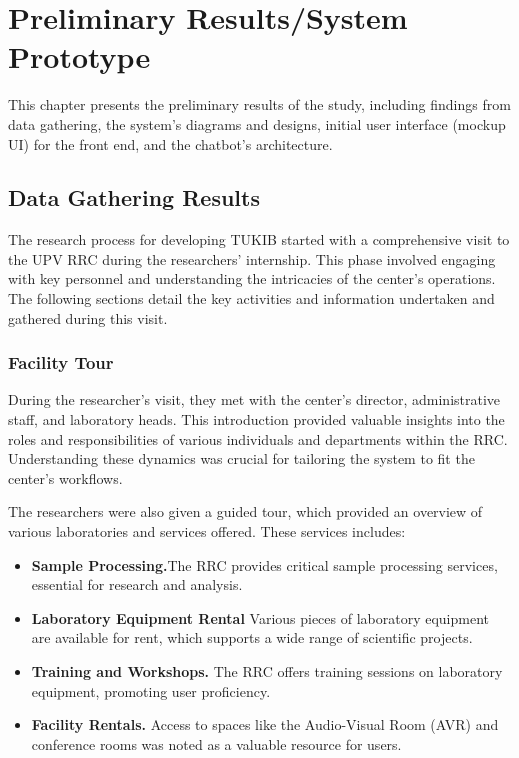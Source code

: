 \chapter{Preliminary Results/System Prototype}
This chapter presents the preliminary results of the study, including findings from data gathering, the system's diagrams and designs, initial user interface (mockup UI) for the front end, and the chatbot's architecture.

\section{Data Gathering Results}
The research process for developing TUKIB started with a comprehensive visit to the UPV RRC during the researchers' internship. This phase involved engaging with key personnel and understanding the intricacies of the center's operations. The following sections detail the key activities and information undertaken and gathered during this visit.

\subsection{Facility Tour}
During the researcher's visit, they met with the center's director, administrative staff, and laboratory heads. This introduction provided valuable insights into the roles and responsibilities of various individuals and departments within the RRC. Understanding these dynamics was crucial for tailoring the system to fit the center’s workflows.

The researchers were also given a guided tour, which provided an overview of various laboratories and services offered. These services includes:

\begin{itemize}
	\item \textbf{Sample Processing.}The RRC provides critical sample processing services, essential for research and analysis.
	\item \textbf{Laboratory Equipment Rental} Various pieces of laboratory equipment are available for rent, which supports a wide range of scientific projects.
	\item \textbf{Training and Workshops.} The RRC offers training sessions on laboratory equipment, promoting user proficiency.
	\item \textbf{Facility Rentals.} Access to spaces like the Audio-Visual Room (AVR) and conference rooms was noted as a valuable resource for users.
\end{itemize}

